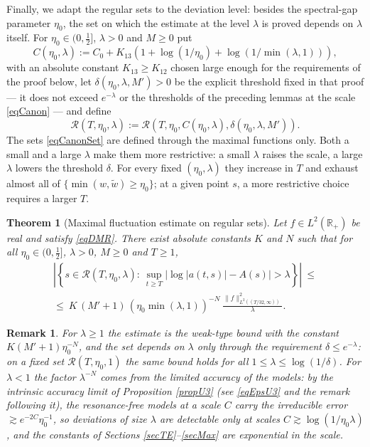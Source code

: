 \documentclass[11pt,twoside,reqno]{amsart}
\def\ti{\tilde}
\def\R{{\mathbb R}}
\def\RR{{\mathcal{R}}}
\def\d{\delta}
\theoremstyle{plain}
\newtheorem{theorem}{Theorem}
\newtheorem{remark}{Remark}
\numberwithin{equation}{section}
\begin{document}
Finally, we adapt the regular sets to the deviation level: besides the spectral-gap parameter $\eta_0$, the set on which the estimate at the level $\lambda$ is proved depends on $\lambda$ itself. For $\eta_0\in(0,\tfrac12]$, $\lambda>0$ and $M\geq0$ put
\begin{equation}
C(\eta_0,\lambda):=C_0+K_{13}\left(1+\log(1/\eta_0)+\log\left(1/\min(\lambda,1)\right)\right),
\label{eqCanon}
\end{equation}
with an absolute constant $K_{13}\geq K_{12}$ chosen large enough for the requirements of the proof below, let $\d(\eta_0,\lambda,M')>0$ be the explicit threshold fixed in that proof --- it does not exceed $e^{-\lambda}$ or the thresholds of the preceding lemmas at the scale \eqref{eqCanon} --- and define
\begin{equation}
\RR(T,\eta_0,\lambda):=\RR\left(T,\eta_0,C(\eta_0,\lambda),\d(\eta_0,\lambda,M')\right).
\label{eqCanonSet}
\end{equation}
The sets \eqref{eqCanonSet} are defined through the maximal functions only. Both a small and a large $\lambda$ make them more restrictive: a small $\lambda$ raises the scale, a large $\lambda$ lowers the threshold $\d$. For every fixed $(\eta_0,\lambda)$ they increase in $T$ and exhaust almost all of $\{\min(w,\ti w)\geq\eta_0\}$; at a given point $s$, a more restrictive choice requires a larger $T$.

\begin{theorem}[Maximal fluctuation estimate on regular sets]\label{thmMaxR}
Let $f\in L^2(\R_+)$ be real and satisfy \eqref{eqDMR}. There exist absolute constants $K$ and $N$ such that for all $\eta_0\in(0,\tfrac12]$, $\lambda>0$, $M\geq0$ and $T\geq1$,
\begin{equation}
\begin{gathered}
\left|\left\{s\in\RR(T,\eta_0,\lambda):\ \sup_{t\geq T}\big|\log|a(t,s)|-A(s)\big|>\lambda\right\}\right|\ \leq\\
\leq\ K\,(M'+1)\,\left(\eta_0\min(\lambda,1)\right)^{-N}\ \frac{\|f\|^2_{L^2((T/32,\infty))}}{\lambda}.
\end{gathered}
\label{eqMaxT}
\end{equation}
\end{theorem}

\begin{remark}\label{remOneDial}
For $\lambda\geq1$ the estimate is the weak-type bound with the constant $K(M'+1)\eta_0^{-N}$, and the set depends on $\lambda$ only through the requirement $\d\leq e^{-\lambda}$: on a fixed set $\RR(T,\eta_0,1)$ the same bound holds for all $1\leq\lambda\leq\log(1/\d)$. For $\lambda<1$ the factor $\lambda^{-N}$ comes from the limited accuracy of the models: by the intrinsic accuracy limit of Proposition \ref{propU3} (see \eqref{eqEpsU3} and the remark following it), the resonance-free models at a scale $C$ carry the irreducible error $\gtrsim e^{-2C}\eta_0^{-1}$, so deviations of size $\lambda$ are detectable only at scales $C\gtrsim\log(1/\eta_0\lambda)$, and the constants of Sections \ref{secTE}--\ref{secMax} are exponential in the scale.
\end{remark}
\end{document}
